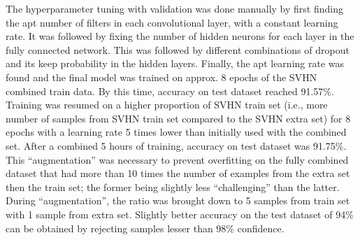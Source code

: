 \documentclass{article}
\begin{document}
	The hyperparameter tuning with validation was done manually by first finding the apt number of filters in each convolutional layer, with a constant learning rate. It was followed by fixing the number of hidden neurons for each layer in the fully connected network. This was followed by different combinations of dropout and its keep probability in the hidden layers. Finally, the apt learning rate was found and the final model was trained on approx. 8 epochs of the SVHN combined train data. By this time, accuracy on test dataset reached 91.57\%. Training was resumed on a higher proportion of SVHN train set (i.e., more number of samples from SVHN train set compared to the SVHN extra set) for 8 epochs with a learning rate 5 times lower than initially used with the combined set. After a combined 5 hours of training, accuracy on test dataset was 91.75\%. This ``augmentation'' was necessary to prevent overfitting on the fully combined dataset that had more than 10 times the number of examples from the extra set then the train set; the former being slightly less ``challenging'' than the latter. During ``augmentation'', the ratio was brought down to 5 samples from train set with 1 sample from extra set. Slightly better accuracy on the test dataset of 94\% can be obtained by rejecting samples lesser than 98\% confidence.
	
\end{document}

